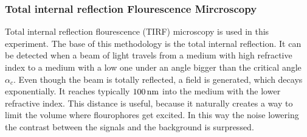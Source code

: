         \subsubsection{Total internal reflection Flourescence Mircroscopy}
            Total internal reflection flourescence (TIRF) microscopy is used in this experiment. The base of this methodology is the total internal reflection. It can be detected when a beam of light travels from a medium with high refractive index to a medium with a low one under an angle bigger than the critical angle $\alpha_c$.
            Even though the beam is totally reflected, a field is generated, which decays exponentially. It reaches typically $\unit[100]{nm}$ into the medium with the lower refractive index.
            This distance is useful, because it naturally creates a way to limit the volume where flourophores get excited. In this way the noise lowering the contrast between the signals and the background is surpressed.
            
